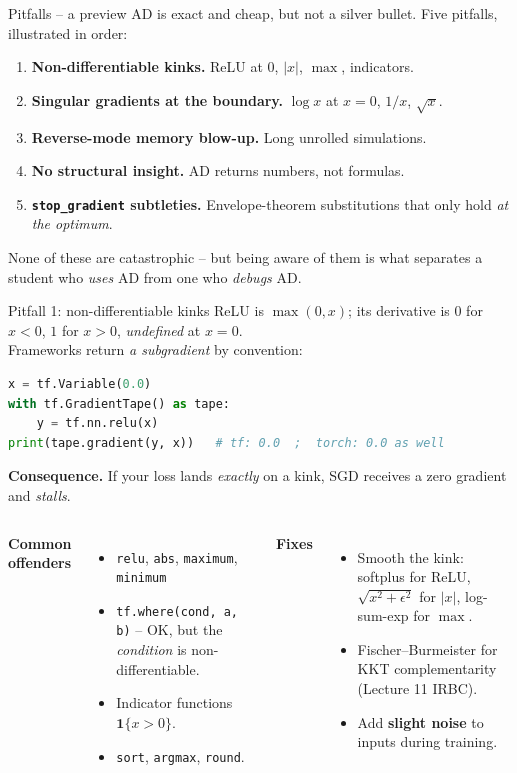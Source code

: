 \documentclass[aspectratio=169,11pt]{beamer}
\newcommand{\emphc}[1]{\textcolor{harvardcrimson}{#1}}
\begin{document}
\begin{frame}{Pitfalls -- a preview}
\small AD is exact and cheap, but not a silver bullet. Five pitfalls, illustrated in order:
\begin{enumerate}\itemsep3pt
\item \textbf{Non-differentiable kinks.} ReLU at 0, $|x|$, $\max$, indicators.
\item \textbf{Singular gradients at the boundary.} $\log x$ at $x=0$, $1/x$, $\sqrt{x}$.
\item \textbf{Reverse-mode memory blow-up.} Long unrolled simulations.
\item \textbf{No structural insight.} AD returns numbers, not formulas.
\item \textbf{\texttt{stop\_gradient} subtleties.} Envelope-theorem substitutions that only hold \emph{at the optimum}.
\end{enumerate}
\vspace{6pt}
\emphc{None of these are catastrophic} -- but being aware of them is what separates a student who \emph{uses} AD from one who \emph{debugs} AD.
\end{frame}

\begin{frame}[fragile]{Pitfall 1: non-differentiable kinks}
\small ReLU is $\max(0,x)$; its derivative is $0$ for $x<0$, $1$ for $x>0$, \emph{undefined} at $x=0$.\\ Frameworks return \emph{a subgradient} by convention:
\begin{lstlisting}[language=Python,basicstyle=\ttfamily\scriptsize]
x = tf.Variable(0.0)
with tf.GradientTape() as tape:
    y = tf.nn.relu(x)
print(tape.gradient(y, x))   # tf: 0.0  ;  torch: 0.0 as well
\end{lstlisting}
\textbf{Consequence.} If your loss lands \emph{exactly} on a kink, SGD receives a zero gradient and \emph{stalls}.
\vspace{4pt}
\begin{columns}
\textbf{Common offenders}
\begin{itemize}\itemsep2pt
\item \texttt{relu}, \texttt{abs}, \texttt{maximum}, \texttt{minimum}
\item \texttt{tf.where(cond, a, b)} -- OK, but the \emph{condition} is non-differentiable.
\item Indicator functions $\mathbf{1}\{x > 0\}$.
\item \texttt{sort}, \texttt{argmax}, \texttt{round}.
\end{itemize}
\textbf{Fixes}
\begin{itemize}\itemsep2pt
\item \emphc{Smooth the kink:} softplus for ReLU, $\sqrt{x^2 + \epsilon^2}$ for $|x|$, log-sum-exp for $\max$.
\item \emphc{Fischer--Burmeister} for KKT complementarity (Lecture 11 IRBC).
\item Add \textbf{slight noise} to inputs during training.
\end{itemize}
\end{columns}
\end{frame}
\end{document}
